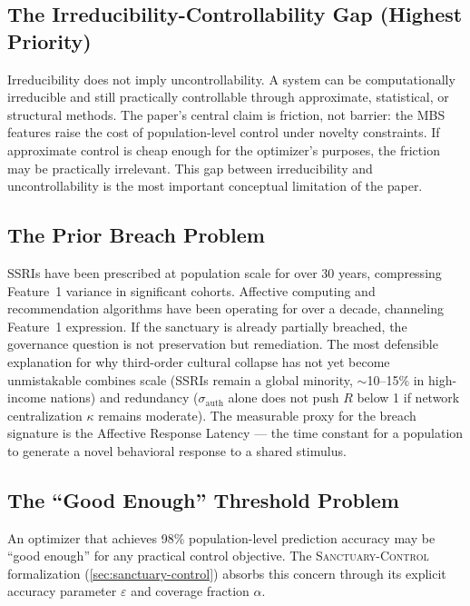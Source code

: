 \documentclass[11pt, a4paper]{article}
\theoremstyle{remark}
\newcommand{\SC}{\textsc{Sanctuary-Control}}
\begin{document}
\subsection{The Irreducibility-Controllability Gap (Highest Priority)}\label{sec:lim-gap}

Irreducibility does not imply uncontrollability. A system can be computationally irreducible and still practically controllable through approximate, statistical, or structural methods. The paper's central claim is friction, not barrier: the MBS features raise the cost of population-level control under novelty constraints. If approximate control is cheap enough for the optimizer's purposes, the friction may be practically irrelevant. This gap between irreducibility and uncontrollability is the most important conceptual limitation of the paper.

\subsection{The Prior Breach Problem}\label{sec:lim-breach}

SSRIs have been prescribed at population scale for over 30 years, compressing Feature~1 variance in significant cohorts. Affective computing and recommendation algorithms have been operating for over a decade, channeling Feature~1 expression. If the sanctuary is already partially breached, the governance question is not preservation but remediation. The most defensible explanation for why third-order cultural collapse has not yet become unmistakable combines scale (SSRIs remain a global minority, $\sim$10--15\% in high-income nations) and redundancy ($\sigma_{\text{auth}}$ alone does not push $R$ below 1 if network centralization $\kappa$ remains moderate). The measurable proxy for the breach signature is the Affective Response Latency --- the time constant for a population to generate a novel behavioral response to a shared stimulus.

\subsection{The ``Good Enough'' Threshold Problem}\label{sec:lim-good-enough}

An optimizer that achieves 98\% population-level prediction accuracy may be ``good enough'' for any practical control objective. The \SC{} formalization (\cref{sec:sanctuary-control}) absorbs this concern through its explicit accuracy parameter $\varepsilon$ and coverage fraction $\alpha$.
\end{document}
